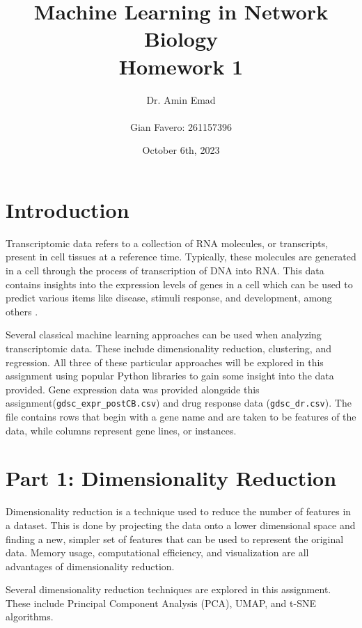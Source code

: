 \documentclass[12pt]{article}
\begin{document}
\title{Machine Learning in Network Biology\\Homework 1}
\author{
    Dr. Amin Emad \\ \\
    Gian Favero: 261157396 \\
}
\date{October 6th, 2023}
\maketitle
\newpage

\tableofcontents
\newpage

\section{Introduction}
Transcriptomic data refers to a collection of RNA molecules, or transcripts, present in cell tissues at a reference time. Typically, these molecules are generated in a cell through the process of transcription of DNA into RNA. This data contains insights into the expression levels of genes in a cell which can be used to predict various items like disease, stimuli response, and development, among others \cite{noauthor_transcriptome_nodate}.

Several classical machine learning approaches can be used when analyzing transcriptomic data. These include dimensionality reduction, clustering, and regression. All three of these particular approaches will be explored in this assignment using popular Python libraries to gain some insight into the data provided. Gene expression data was provided alongside this assignment(\verb|gdsc_expr_postCB.csv|) and drug response data (\verb|gdsc_dr.csv|). The file contains rows that begin with a gene name and are taken to be features of the data, while columns represent gene lines, or instances. 

\section{Part 1: Dimensionality Reduction}
Dimensionality reduction is a technique used to reduce the number of features in a dataset. This is done by projecting the data onto a lower dimensional space and finding a new, simpler set of features that can be used to represent the original data. Memory usage, computational efficiency, and visualization are all advantages of dimensionality reduction.

Several dimensionality reduction techniques are explored in this assignment. These include Principal Component Analysis (PCA), UMAP, and t-SNE algorithms.
\end{document}
